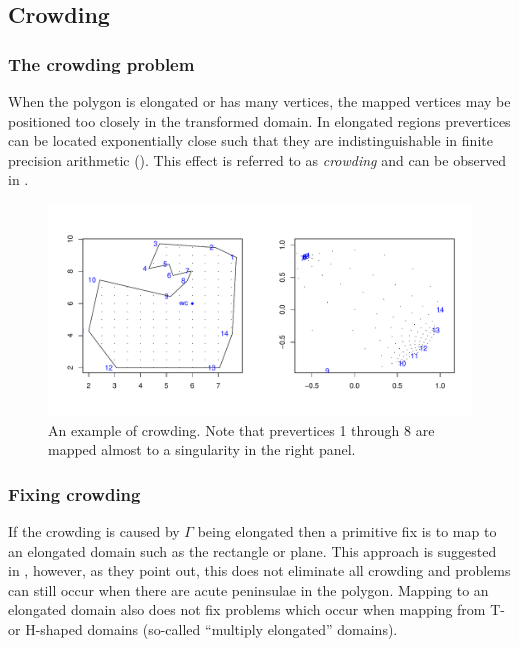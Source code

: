\subsection{Crowding}
\label{sch-crowding}

\subsubsection{The crowding problem}
When the polygon is elongated or has many vertices, the mapped vertices may be positioned too closely in the transformed domain. In elongated regions prevertices can be located exponentially close such that they are indistinguishable in finite precision arithmetic (\cite{howell90}). This effect is referred to as \emph{crowding} and can be observed in . 

\begin{figure} [tbp]
\centering
\includegraphics[scale=0.5]{sc/figs/crowdeddisk.pdf}
\caption{An example of crowding. Note that prevertices 1 through 8 are mapped almost to a singularity in the right panel.}
\label{crowdeddisk}
\end{figure}

\subsubsection{Fixing crowding}
\label{sc-crdt}

If the crowding is caused by $\Gamma$ being elongated then a  primitive fix is to map to an elongated domain such as the rectangle or plane. This approach is suggested in , however, as they point out, this does not eliminate all crowding and problems can still occur when there are acute peninsulae in the polygon. Mapping to an elongated domain also does not fix problems which occur when mapping from T- or H-shaped domains (so-called ``multiply elongated'' domains).

